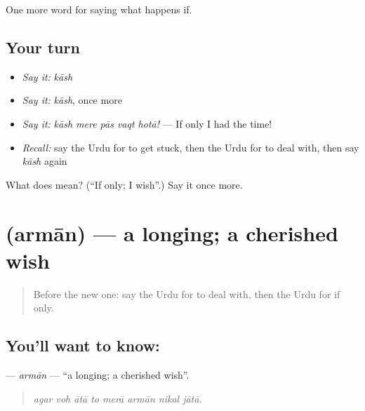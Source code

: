 \begin{grammarlens}[title={What you've built}]
One more word for saying what happens if.
\end{grammarlens}

\subsection*{Your turn}
\begin{itemize}
\raggedright
  \item \emph{Say it:} \emph{kāsh}
  \item \emph{Say it:} \emph{kāsh}, once more
  \item \emph{Say it:} \emph{kāsh mere pās vaqt hotā!} — If only I had the time!
  \item \emph{Recall:} say the Urdu for to get stuck, then the Urdu for to deal with, then say \emph{kāsh} again
\end{itemize}

\begin{tcolorbox}[breakable,colback=teal!4,colframe=teal!35!black,title={Before you move on}]
What does  mean? (\textquotedblleft{}If only; I wish\textquotedblright{}.) Say it once more.
\end{tcolorbox}
\section[\texorpdfstring{\ur{ارمان} (armān)}{ارمان (armān)}]{ (armān) — a longing; a cherished wish}

\label{lesson:UR-C369-arman}



\begin{quote}
Before the new one: say the Urdu for to deal with, then the Urdu for if only.
\end{quote}

\subsection*{You'll want to know: }
\textbf{} — \emph{armān} — \textquotedblleft{}a longing; a cherished wish\textquotedblright{}.

\begin{quote}
       
\end{quote}

\begin{quote}
\emph{agar voh ātā to merā armān nikal jātā.}
\end{quote}

